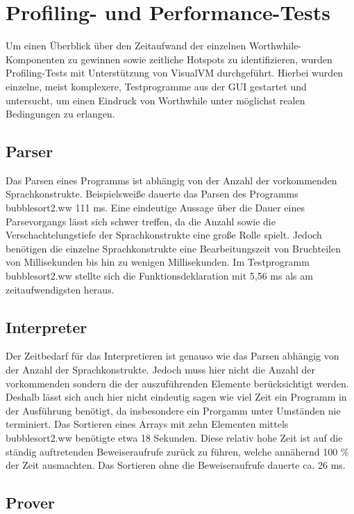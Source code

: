 \section{Profiling- und Performance-Tests}

Um einen Überblick über den Zeitaufwand der einzelnen Worthwhile-Komponenten zu gewinnen sowie zeitliche Hotspots zu identifizieren, wurden Profiling-Tests mit Unterstützung von VisualVM durchgeführt. Hierbei wurden einzelne, meist komplexere, Testprogramme aus der GUI gestartet und untersucht, um einen Eindruck von Worthwhile unter möglichst realen Bedingungen zu erlangen.

\subsection{Parser}

Das Parsen eines Programms ist abhängig von der Anzahl der vorkommenden Sprachkonstrukte. Beispielsweiße dauerte das Parsen des Programms bubblesort2.ww 111 ms. Eine eindeutige Aussage über die Dauer eines Parsevorgangs lässt sich schwer treffen, da die Anzahl sowie die Verschachtelungstiefe der Sprachkonstrukte eine große Rolle spielt. Jedoch benötigen die einzelne Sprachkonstrukte eine Bearbeitungszeit von Bruchteilen von Millisekunden bis hin zu wenigen Millisekunden. Im Testprogramm bubblesort2.ww stellte sich die Funktionsdeklaration mit 5,56 ms als am zeitaufwendigsten heraus.

\subsection{Interpreter}

Der Zeitbedarf für das Interpretieren ist genauso wie das Parsen abhängig von der Anzahl der Sprachkonstrukte. Jedoch muss hier nicht die Anzahl der vorkommenden sondern die der auszuführenden Elemente berücksichtigt werden. Deshalb lässt sich auch hier nicht eindeutig sagen wie viel Zeit ein Programm in der Ausführung benötigt, da insbesondere ein Prorgamm unter Umständen nie terminiert. Das Sortieren eines Arrays mit zehn Elementen mittels bubblesort2.ww benötigte etwa 18 Sekunden. Diese relativ hohe Zeit ist auf die ständig auftretenden Beweiseraufrufe zurück zu führen, welche annähernd 100 \% der Zeit ausmachten. Das Sortieren ohne die Beweiseraufrufe dauerte ca. 26 ms.

\subsection{Prover}

